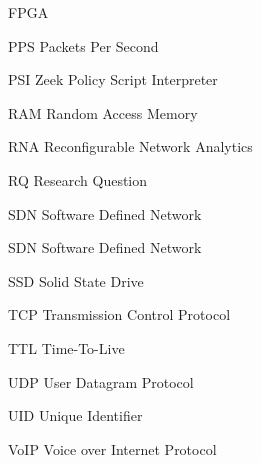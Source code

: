 \begin{listofabbrv}{FPGA}
    \item[PPS]  Packets Per Second
    \item[PSI]  Zeek Policy Script Interpreter
    \item[RAM]  Random Access Memory
    \item[RNA]  Reconfigurable Network Analytics
    \item[RQ]   Research Question
    \item[SDN]  Software Defined Network
    \item[SDN]  Software Defined Network
    \item[SSD]  Solid State Drive
    \item[TCP]  Transmission Control Protocol
    \item[TTL]  Time-To-Live
    \item[UDP]  User Datagram Protocol
    \item[UID]  Unique Identifier
    \item[VoIP] Voice over Internet Protocol
\end{listofabbrv}
